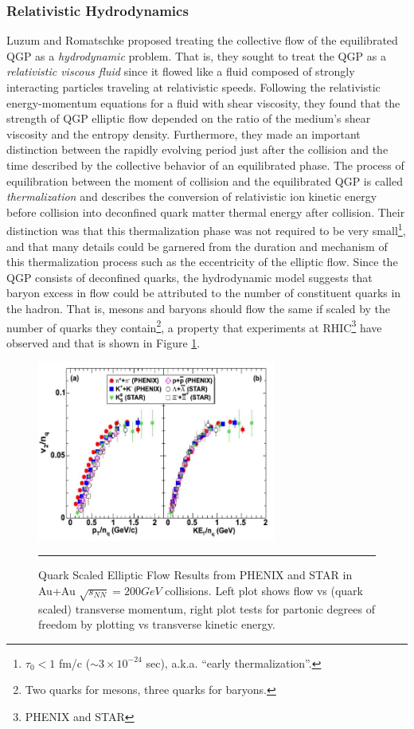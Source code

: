 \subsubsection{Relativistic Hydrodynamics}
Luzum and Romatschke \citep{PhysRevC.78.034915} proposed treating the collective flow of the equilibrated QGP as a \textit{hydrodynamic} problem. That is, they sought to treat the QGP as a \textit{relativistic viscous fluid} since it flowed like a fluid composed of strongly interacting particles traveling at relativistic speeds. Following the relativistic energy-momentum equations for a fluid with shear viscosity, they found that the strength of QGP elliptic flow depended on the ratio of the medium's shear viscosity and the entropy density. Furthermore, they made an important distinction between the rapidly evolving period just after the collision and the time described by the collective behavior of an equilibrated phase. The process of equilibration between the moment of collision and the equilibrated QGP is called \textit{thermalization} and describes the conversion of relativistic ion kinetic energy before collision into deconfined quark matter thermal energy after collision. Their distinction was that this thermalization phase was not required to be very small\footnote{$\tau_0 < 1$ fm/c ($\sim 3 \times 10^{-24}$ sec), a.k.a. ``early thermalization''.}, and that many details could be garnered from the duration and mechanism of this thermalization process such as the eccentricity of the elliptic flow. Since the QGP consists of deconfined quarks, the hydrodynamic model suggests that baryon excess in flow could be attributed to the number of constituent quarks in the hadron. That is, mesons and baryons should flow the same if scaled by the number of quarks they contain\footnote{Two quarks for mesons, three quarks for baryons.}, a property that experiments at RHIC\footnote{PHENIX and STAR} have observed and that is shown in Figure \ref{fig:quarkscaledv2}.

\begin{figure}[H]
  \centering   
    \includegraphics[width=0.7\textwidth]{prevplots/quarkscaledv2.JPG}
  \rule{35em}{0.5pt}
  \caption[Quark Scaled Elliptic Flow Results from PHENIX and STAR in Au+Au $\sqrt{s_NN}=200 GeV$ collisions]{Quark Scaled Elliptic Flow Results from PHENIX and STAR \citep{velkovska:lec12} in Au+Au $\sqrt{s_{NN}}=200 GeV$ collisions. Left plot shows flow vs (quark scaled) transverse momentum, right plot tests for partonic degrees of freedom by plotting vs transverse kinetic energy.}
  \label{fig:quarkscaledv2}  
\end{figure} 

